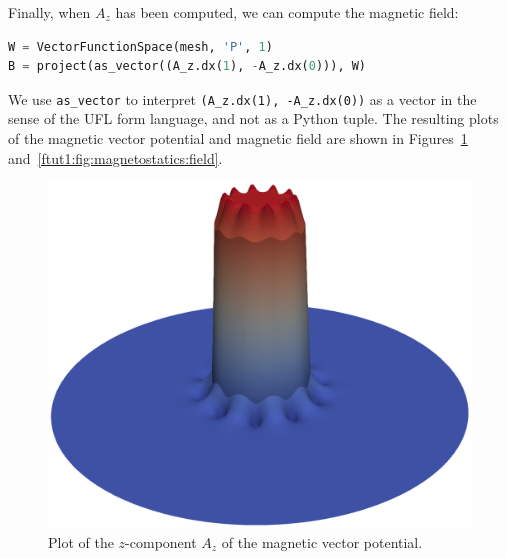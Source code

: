 \documentclass[graybox,envcountchap,sectrefs,final]{svmonodo}
\begin{document}
Finally, when $A_z$ has been computed, we can compute the magnetic
field:

\begin{lstlisting}[language=Python,style=graycolor]
W = VectorFunctionSpace(mesh, 'P', 1)
B = project(as_vector((A_z.dx(1), -A_z.dx(0))), W)
\end{lstlisting}
We use \Verb!as_vector! to interpret
\Verb!(A_z.dx(1), -A_z.dx(0))! as a vector in the sense of the UFL
form language, and not as a Python tuple. The resulting plots of the
magnetic vector potential and magnetic field are shown in Figures~\ref{ftut1:fig:magnetostatics:potential} and~\ref{ftut1:fig:magnetostatics:field}.


\begin{figure}[!ht]  %
  \centerline{\includegraphics[width=0.95\linewidth]{fig/magnetostatics_potential.png}}
  \caption{
  Plot of the $z$-component $A_z$ of the magnetic vector potential. \label{ftut1:fig:magnetostatics:potential}
  }
\end{figure}
\end{document}
